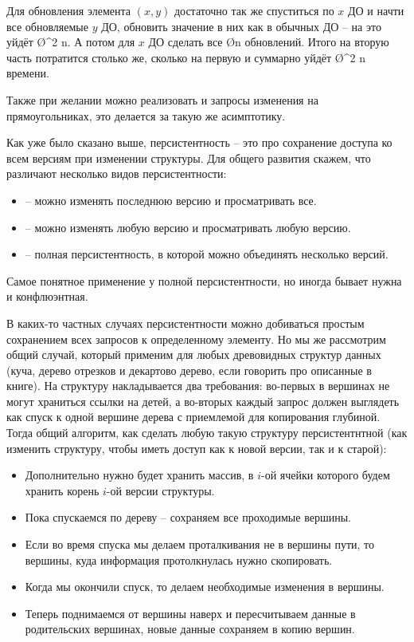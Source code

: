 Для обновления элемента $(x, y)$ достаточно так же спуститься по $x$ ДО и начти все обновляемые $y$ ДО, обновить значение в них как в обычных ДО -- на это уйдёт \O{\log^2 n}. А потом для $x$ ДО сделать все \O{\log n} обновлений. Итого на вторую часть потратится столько же, сколько на первую и суммарно уйдёт \O{\log^2 n} времени.

Также при желании можно реализовать и запросы изменения на прямоугольниках, это делается за такую же асимптотику.


Как уже было сказано выше, персистентность -- это про сохранение доступа ко всем версиям при изменении структуры. Для общего развития скажем, что различают несколько видов персистентности:

\begin{itemize}
    \item {} -- можно изменять последнюю версию и просматривать все.
    \item {} -- можно изменять любую версию и просматривать любую версию.
    \item {} -- полная персистентность, в которой можно объединять несколько версий.
\end{itemize}

Самое понятное применение у полной персистентности, но иногда бывает нужна и конфлюэнтная.

В каких-то частных случаях персистентности можно добиваться простым сохранением всех запросов к определенному элементу. Но мы же рассмотрим общий случай, который применим для любых древовидных структур данных (куча, дерево отрезков и декартово дерево, если говорить про описанные в книге). На структуру накладывается два требования: во-первых в вершинах не могут храниться ссылки на детей, а во-вторых каждый запрос должен выглядеть как спуск к одной вершине дерева с приемлемой для копирования глубиной. Тогда общий алгоритм, как сделать любую такую структуру персистентнтной (как изменить структуру, чтобы иметь доступ как к новой версии, так и к старой):

\begin{itemize}
    \item Дополнительно нужно будет хранить массив, в $i$-ой ячейки которого будем хранить корень $i$-ой версии структуры.
    \item Пока спускаемся по дереву -- сохраняем все проходимые вершины.
    \item Если во время спуска мы делаем проталкивания не в вершины пути, то вершины, куда информация протолкнулась нужно скопировать.
    \item Когда мы окончили спуск, то делаем необходимые изменения в вершины.
    \item Теперь поднимаемся от вершины наверх и пересчитываем данные в родительских вершинах, новые данные сохраняем в копию вершин.
\end{itemize}

